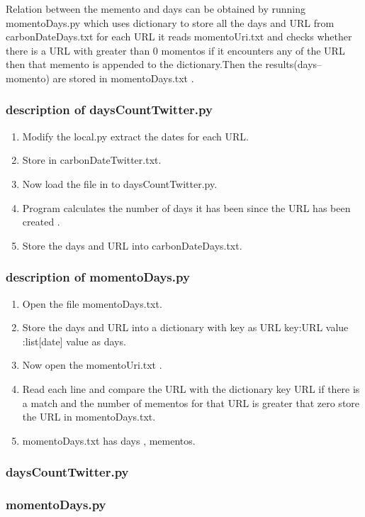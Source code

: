 \documentclass[12pt]{article}
\begin{document}
Relation between the memento and days can be obtained by running momentoDays.py which uses dictionary to store all the days and URL from carbonDateDays.txt for each URL it reads momentoUri.txt and checks whether there is a URL with greater than 0 momentos if it encounters any of the URL then that memento is appended to the dictionary.Then the results(days--momento) are stored in momentoDays.txt .
\subsubsection{description of daysCountTwitter.py}
\begin{enumerate}
	\item Modify the local.py extract the dates for each URL.
	\item Store in carbonDateTwitter.txt.
	\item Now load the file in to daysCountTwitter.py.
	\item Program calculates the number of days it has been since the URL has been created .
	\item Store the days and URL into carbonDateDays.txt.	
\end{enumerate}
\subsubsection{description of momentoDays.py}
\begin{enumerate}
	\item Open the file momentoDays.txt.
	\item Store the days and URL into a dictionary with key as URL {key:URL value :list[date]} value as days.	
	\item Now open the momentoUri.txt .
	\item Read each line and compare the URL with the dictionary key URL if there is a match and the number of mementos for that URL is greater that zero store the URL in momentoDays.txt.
	\item momentoDays.txt has days , mementos.
\end{enumerate}

\newpage
\subsubsection{daysCountTwitter.py}

\newpage
\subsubsection{momentoDays.py}

\newpage
\end{document}
